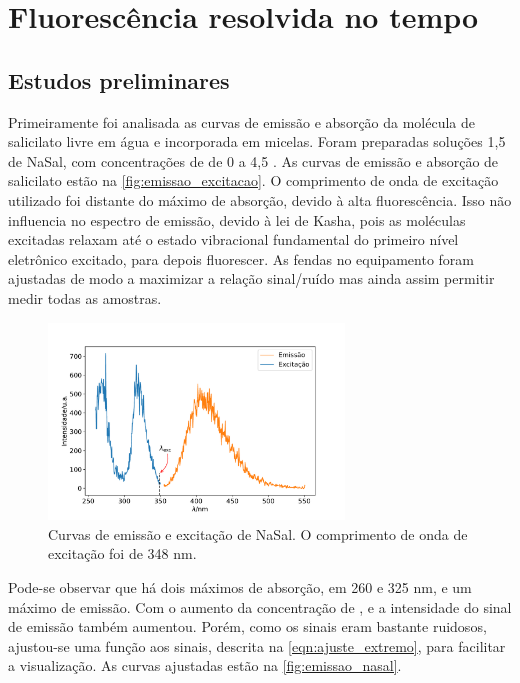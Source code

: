 	\chapter{Fluorescência resolvida no tempo}
	
	\section{Estudos preliminares}  
	
	Primeiramente foi analisada as curvas de emissão e absorção da molécula de salicilato livre em água e incorporada em micelas. Foram preparadas soluções 1,5 \mM{} de NaSal, com concentrações de \TTAB{} de 0 a 4,5 \mM. As curvas de emissão e absorção de salicilato estão na \autoref{fig:emissao_excitacao}. O comprimento de onda de excitação utilizado foi distante do máximo de absorção, devido à alta fluorescência. Isso não influencia no espectro de emissão, devido à lei de Kasha, pois as moléculas excitadas relaxam até o estado vibracional fundamental do primeiro nível eletrônico excitado, para depois fluorescer. As fendas no equipamento foram ajustadas de modo a maximizar a relação sinal/ruído mas ainda assim permitir medir todas as amostras.
	
	\begin{figure}[h]
		\centering
		\includegraphics[width=0.7\textwidth]{imagens/fluor/emissao_excitacao}
		\caption{Curvas de emissão e excitação de NaSal. O comprimento de onda de excitação foi de 348 nm.}
		\label{fig:emissao_excitacao}
	\end{figure}

	Pode-se observar que há dois máximos de absorção, em 260 e 325 nm, e um máximo de emissão. Com o aumento da concentração de \TTAB{}, e a intensidade do sinal de emissão também aumentou. Porém, como os sinais eram bastante ruidosos, ajustou-se uma função aos sinais, descrita na \autoref{eqn:ajuste_extremo}, para facilitar a visualização. As curvas ajustadas estão na \autoref{fig:emissao_nasal}.

